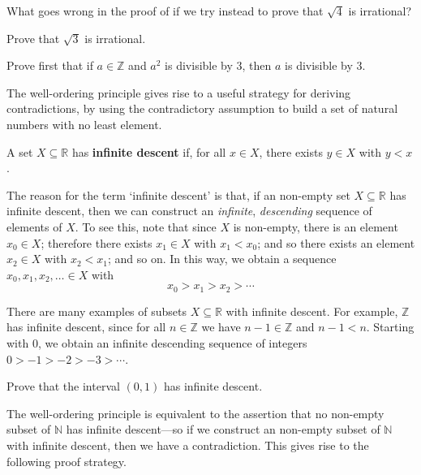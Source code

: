 \begin{exercise}
What goes wrong in the proof of  if we try instead to prove that $\sqrt{4}$ is irrational?
\end{exercise}

\begin{exercise}
\label{exSquareRootThreeIsIrrational}
Prove that $\sqrt{3}$ is irrational.
\begin{backhint}
Prove first that if $a \in \mathbb{Z}$ and $a^2$ is divisible by $3$, then $a$ is divisible by $3$.
\end{backhint}
\end{exercise}

The well-ordering principle gives rise to a useful strategy for deriving contradictions, by using the contradictory assumption to build a set of natural numbers with no least element.

\begin{definition}
\label{defInfiniteDescent}
A set $X \subseteq \mathbb{R}$ has \textbf{infinite descent} if, for all $x \in X$, there exists $y \in X$ with $y < x$.
\end{definition}

The reason for the term `infinite descent' is that, if an non-empty set $X \subseteq \mathbb{R}$ has infinite descent, then we can construct an \textit{infinite}, \textit{descending} sequence of elements of $X$. To see this, note that since $X$ is non-empty, there is an element $x_0 \in X$; therefore there exists $x_1 \in X$ with $x_1 < x_0$; and so there exists an element $x_2 \in X$ with $x_2 < x_1$; and so on. In this way, we obtain a sequence $x_0,x_1,x_2,\dots{} \in X$ with
\[ x_0 > x_1 > x_2 > \cdots \]

\begin{example}
There are many examples of subsets $X \subseteq \mathbb{R}$ with infinite descent. For example, $\mathbb{Z}$ has infinite descent, since for all $n \in \mathbb{Z}$ we have $n-1 \in \mathbb{Z}$ and $n-1 < n$. Starting with $0$, we obtain an infinite descending sequence of integers $0 > -1 > -2 > -3 > \cdots$.
\end{example}

\begin{exercise}
Prove that the interval $(0,1)$ has infinite descent.
\end{exercise}

The well-ordering principle is equivalent to the assertion that no non-empty subset of $\mathbb{N}$ has infinite descent---so if we construct an non-empty subset of $\mathbb{N}$ with infinite descent, then we have a contradiction. This gives rise to the following proof strategy.

